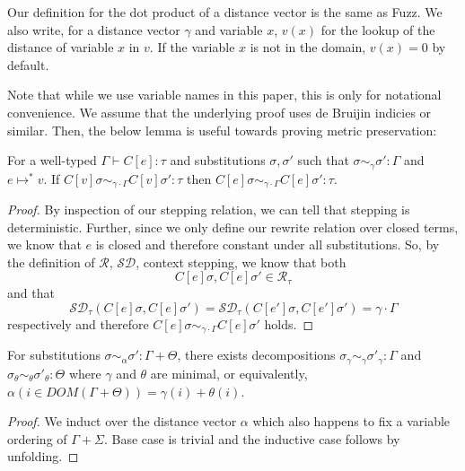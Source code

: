 Our definition for the dot product of a distance vector is the same as Fuzz.
We also write, for a distance vector $\gamma$ and variable $x$, $v(x)$ for the
lookup of the distance of variable $x$ in $v$. If the variable $x$ is not in the
domain, $v(x) = 0$ by default.


Note that while we use variable names in this paper, this is only for notational
convenience. We assume that the underlying proof uses de Bruijin indicies or
similar. Then, the below lemma is useful towards proving metric preservation:
\begin{lemma}
  \label{thm:ctx-stepping}
  For a well-typed $\Gamma \vdash C[e] : \tau$ and substitutions $\sigma,
  \sigma'$ such that $\sigma \sim_{\gamma} \sigma' : \Gamma$ and
  $e \mapsto^{*} v$.
  If $C[v] \sigma \sim_{\gamma \cdot \Gamma} C[v] \sigma' : \tau$ then
  $C[e] \sigma \sim_{\gamma \cdot \Gamma} C [e] \sigma' : \tau$.
\end{lemma}
\begin{proof}
  By inspection of our stepping relation, we can tell that stepping is
  deterministic. Further, since we only define our rewrite relation over closed
  terms, we know that $e$ is closed and therefore constant under all
  substitutions. 
  So, by the definition of $\mathcal{R}$, $\mathcal{SD}$, 
  context stepping, we know that both 
  $$C[e] \sigma, C[e] \sigma' \in \mathcal{R}_{\tau}$$ 
  and that 
  $$\mathcal{SD}_{\tau}(C[e]\sigma, C[e]\sigma') = \mathcal{SD}_{\tau}(C[e']\sigma, C[e']\sigma') = \gamma \cdot \Gamma$$
  respectively and therefore $C[e] \sigma \sim_{\gamma \cdot \Gamma} C[e]
  \sigma'$ holds.
\end{proof}

\begin{lemma}
  \label{thm:sub-decomp}
  For substitutions $\sigma \sim_{\alpha} \sigma' : \Gamma + \Theta$, there
  exists decompositions $\sigma_{\gamma} \sim_{\gamma} \sigma'_{\gamma} :
  \Gamma$ and $\sigma_{\theta} \sim_{\theta} \sigma'_{\theta} : \Theta$ where
  $\gamma$ and $\theta$ are minimal, or equivalently, $\alpha(i \in DOM(\Gamma
  + \Theta)) = \gamma(i) + \theta(i)$.
\end{lemma}
\begin{proof}
  We induct over the distance vector $\alpha$ which also happens to fix a
  variable ordering of $\Gamma + \Sigma$. Base case is trivial and the inductive
  case follows by unfolding.
\end{proof}

